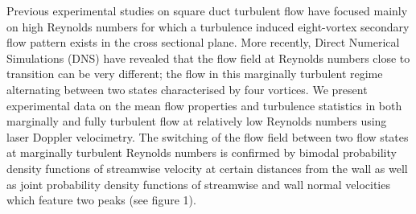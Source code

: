 Previous experimental studies on square duct turbulent flow have focused mainly on high Reynolds numbers for which a turbulence induced eight-vortex secondary flow pattern exists in the cross sectional plane. More recently, Direct Numerical Simulations (DNS) have revealed that the flow field at Reynolds numbers close to transition can be very different; the flow in this marginally turbulent regime alternating between two states characterised by four vortices. We present experimental data on the mean flow properties and turbulence statistics in both marginally and fully turbulent flow at relatively low Reynolds numbers using laser Doppler velocimetry. The switching of the flow field between two flow states at marginally turbulent Reynolds numbers is confirmed by bimodal probability density functions of streamwise velocity at certain distances from the wall as well as joint probability density functions of streamwise and wall normal velocities which feature two peaks (see figure 1).